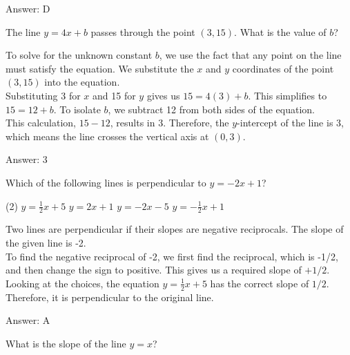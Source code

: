 \documentclass[11pt,paper=a4,answers]{exam}
\begin{document}
\begin{questions}
\begin{solution}
\vspace{15pt}
Answer: \colorbox{yellow!100}{D}
\end{solution}

\question
The line $y = 4x + b$ passes through the point $(3, 15)$. What is the value of $b$?

\begin{solution}
To solve for the unknown constant $b$, we use the fact that any point on the line must satisfy the equation. We substitute the $x$ and $y$ coordinates of the point $(3, 15)$ into the equation.
\\[10pt]
Substituting 3 for $x$ and 15 for $y$ gives us $15 = 4(3) + b$. This simplifies to $15 = 12 + b$. To isolate $b$, we subtract 12 from both sides of the equation.
\\[10pt]
This calculation, $15 - 12$, results in 3. Therefore, the $y$-intercept of the line is 3, which means the line crosses the vertical axis at $(0, 3)$.

\vspace{15pt}
Answer: \colorbox{yellow!100}{3}
\end{solution}

\question
Which of the following lines is perpendicular to $y = -2x + 1$?
\begin{tasks}(2)
    \task $y = \frac{1}{2}x + 5$
    \task $y = 2x + 1$
    \task $y = -2x - 5$
    \task $y = -\frac{1}{2}x + 1$
\end{tasks}

\begin{solution}
Two lines are perpendicular if their slopes are negative reciprocals. The slope of the given line is -2.
\\[10pt]
To find the negative reciprocal of -2, we first find the reciprocal, which is -1/2, and then change the sign to positive. This gives us a required slope of $+1/2$.
\\[10pt]
Looking at the choices, the equation $y = \frac{1}{2}x + 5$ has the correct slope of $1/2$. Therefore, it is perpendicular to the original line.

\vspace{15pt}
Answer: \colorbox{yellow!100}{A}
\end{solution}

\question
What is the slope of the line $y = x$?


\end{questions}
\end{document}

